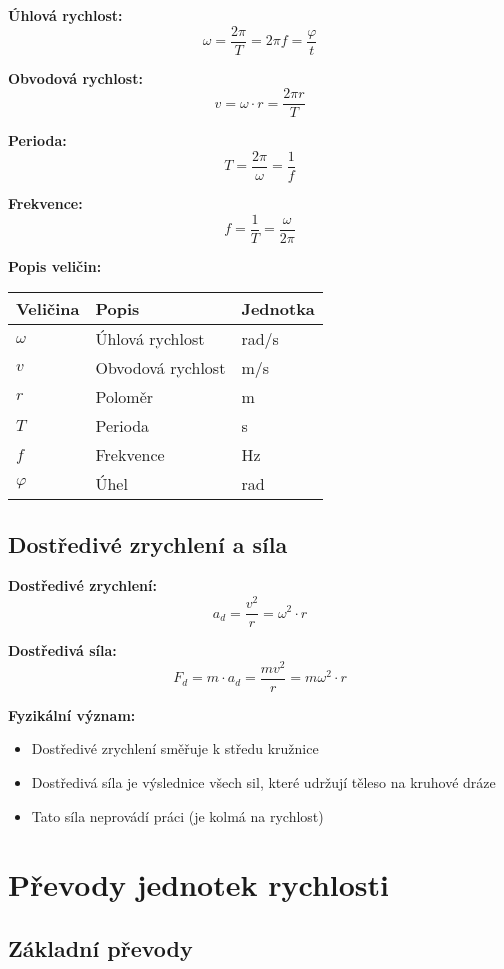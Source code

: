 \documentclass[11pt,a4paper]{article}
\begin{document}
\textbf{Úhlová rychlost:}
\[\omega = \frac{2\pi}{T} = 2\pi f = \frac{\varphi}{t}\]

\textbf{Obvodová rychlost:}
\[v = \omega \cdot r = \frac{2\pi r}{T}\]

\textbf{Perioda:}
\[T = \frac{2\pi}{\omega} = \frac{1}{f}\]

\textbf{Frekvence:}
\[f = \frac{1}{T} = \frac{\omega}{2\pi}\]

\textbf{Popis veličin:}

\begin{longtable}{lll}
\toprule
Veličina & Popis & Jednotka \\
\midrule
$\omega$ & Úhlová rychlost & rad/s \\
$v$ & Obvodová rychlost & m/s \\
$r$ & Poloměr & m \\
$T$ & Perioda & s \\
$f$ & Frekvence & Hz \\
$\varphi$ & Úhel & rad \\
\bottomrule
\end{longtable}

\subsection{Dostředivé zrychlení a síla}

\textbf{Dostředivé zrychlení:}
\[a_d = \frac{v^2}{r} = \omega^2 \cdot r\]

\textbf{Dostředivá síla:}
\[F_d = m \cdot a_d = \frac{m v^2}{r} = m \omega^2 \cdot r\]

\textbf{Fyzikální význam:}
\begin{itemize}
\item Dostředivé zrychlení směřuje k středu kružnice
\item Dostředivá síla je výslednice všech sil, které udržují těleso na kruhové dráze
\item Tato síla neprovádí práci (je kolmá na rychlost)
\end{itemize}

\clearpage

\section{Převody jednotek rychlosti}

\subsection{Základní převody}
\end{document}

